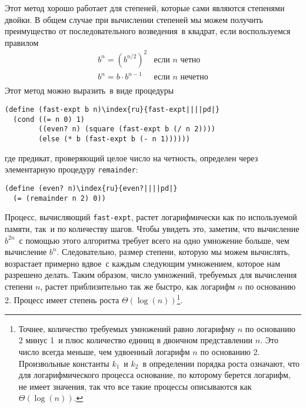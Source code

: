 Этот метод хорошо работает для степеней, которые сами
являются степенями двойки. В общем случае при вычислении степеней мы
можем получить преимущество от последовательного возведения~в квадрат,
если воспользуемся правилом
$$
\begin{array}{ll}
 b^n = (b^{n / 2})^2 & \mbox{если $n$ четно} \\
 b^n = b \cdot b^{n-1} & \mbox{если $n$ нечетно} \\
\end{array}
$$
Этот метод можно выразить~в виде процедуры

\begin{Verbatim}[fontsize=\small]
(define (fast-expt b n)\index{ru}{fast-expt||||pd|}
  (cond ((= n 0) 1)
        ((even? n) (square (fast-expt b (/ n 2))))
        (else (* b (fast-expt b (- n 1))))))
\end{Verbatim}
где предикат, проверяющий целое число на четность, определен через
элементарную процедуру 
{\tt remainder}:

\begin{Verbatim}[fontsize=\small]
(define (even? n)\index{ru}{even?||||pd|}
  (= (remainder n 2) 0))
\end{Verbatim}
Процесс, вычисляющий {\tt fast-expt}, растет
логарифмически как
по используемой памяти, так~и по количеству шагов.  Чтобы увидеть это, 
заметим, что вычисление $b^{2n}$~с помощью этого алгоритма
требует всего на одно умножение больше, чем вычисление
$b^n$. Следовательно, размер степени, которую мы можем
вычислять, возрастает примерно вдвое~с каждым следующим умножением,
которое нам разрешено делать.  Таким образом, число умножений,
требуемых для вычисления степени $n$, растет приблизительно
так же быстро, как логарифм $n$ по основанию 2. Процесс
имеет степень роста $\Theta(\log(n))$\footnote{Точнее, количество требуемых умножений равно
логарифму $n$ по основанию 2 минус 1~и плюс количество единиц 
в двоичном представлении $n$.  Это число всегда меньше, чем 
удвоенный логарифм $n$ по основанию 2.  Произвольные
константы $k_1$~и $k_2$~в определении порядка
роста означают, что для логарифмического процесса основание, по
которому берется логарифм, не имеет значения, так что все такие
процессы описываются как $\Theta(\log(n))$.
\sloppy
}.

